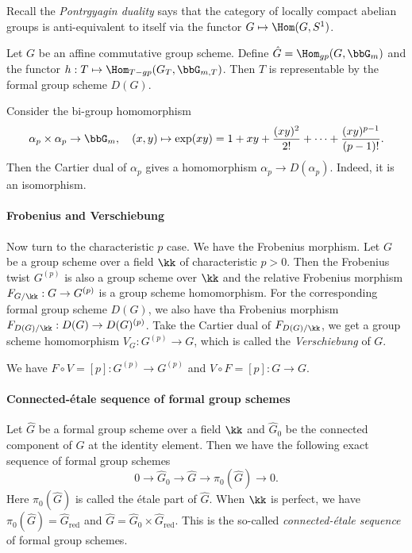 Recall the \emph{Pontrgyagin duality} says that the category of locally compact abelian groups is anti-equivalent to itself via the functor $G \mapsto \Hom(G, S^1)$.

\begin{theorem}
	Let $G$ be an affine commutative group scheme.
	Define $\hat{G} = \Hom_{gp}(G, \bbG_m)$ and the functor $h: T \mapsto \Hom_{T-gp}(G_T, \bbG_{m,T})$.
	Then $T$ is representable by the formal group scheme $D(G)$.
\end{theorem}

Consider the bi-group homomorphism
\[ \alpha_p \times \alpha_p \to \bbG_m, \quad (x, y) \mapsto \exp(xy) = 1 + xy + \frac{(xy)^2}{2!} + \cdots + \frac{(xy)^{p-1}}{(p-1)!}. \]
Then the Cartier dual of $\alpha_p$ gives a homomorphism $\alpha_p \to D(\alpha_p)$.
Indeed, it is an isomorphism.

\paragraph{Frobenius and Verschiebung}
Now turn to the characteristic $p$ case.
We have the Frobenius morphism.
Let $G$ be a group scheme over a field $\kk$ of characteristic $p>0$.
Then the Frobenius twist $G^{(p)}$ is also a group scheme over $\kk$ and the relative Frobenius morphism $F_{G/\kk}: G \to G^{(p)}$ is a group scheme homomorphism.
For the corresponding formal group scheme $D(G)$, we also have tha Frobenius morphism $F_{D(G)/\kk}: D(G) \to D(G)^{(p)}$.
Take the Cartier dual of $F_{D(G)/\kk}$, we get a group scheme homomorphism $V_G: G^{(p)} \to G$, which is called the \emph{Verschiebung} of $G$.

\begin{remark}
	We have $F \circ V = [p]: G^{(p)} \to G^{(p)}$ and $V \circ F = [p]: G \to G$.
\end{remark}

\paragraph{Connected-\'etale sequence of formal group schemes}

Let $\hat{G}$ be a formal group scheme over a field $\kk$ and $\hat{G}_0$ be the connected component of $\hat{G}$ at the identity element.
Then we have the following exact sequence of formal group schemes
\[ 0 \to \hat{G}_0 \to \hat{G} \to \pi_0(\hat{G}) \to 0. \]
Here $\pi_0(\hat{G})$ is called the \'etale part of $\hat{G}$.
When $\kk$ is perfect, we have $\pi_0(\hat{G}) = \hat{G}_{\text{red}}$ and $\hat{G} = \hat{G}_0 \times \hat{G}_{\text{red}}$.
This is the so-called \emph{connected-\'etale sequence} of formal group schemes.

